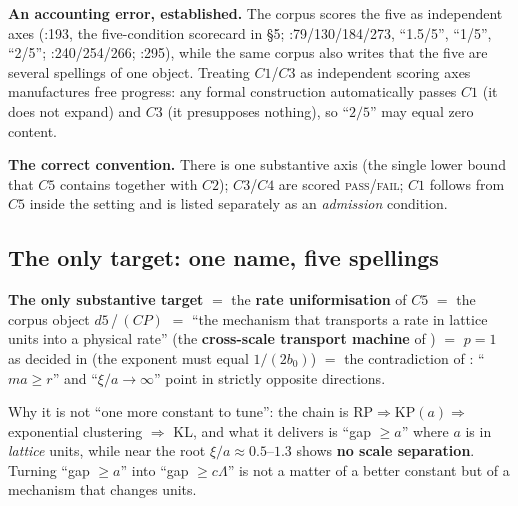 \begin{keybox}
\textbf{An accounting error, established.} The corpus scores the five as independent axes
(:193, the five-condition scorecard in \S5; :79/130/184/273,
``1.5/5'', ``1/5'', ``2/5''; :240/254/266; :295), while the same
corpus also writes that the five are several spellings of one object. Treating $C1$/$C3$ as
independent scoring axes manufactures free progress: any formal construction automatically passes
$C1$ (it does not expand) and $C3$ (it presupposes nothing), so ``$2/5$'' may equal zero content. \LN
\end{keybox}

\noindent
\textbf{The correct convention.} There is one substantive axis (the single lower bound that $C5$
contains together with $C2$); $C3$/$C4$ are scored \textsc{pass}/\textsc{fail}; $C1$ follows from
$C5$ inside the setting and is listed separately as an \emph{admission} condition. \LT
{}

\subsection{The only target: one name, five spellings}

\begin{keybox}
\textbf{The only substantive target} $=$ the \textbf{rate uniformisation} of $C5$
$=$ the corpus object $d5$\,/\,$(CP)$
$=$ ``the mechanism that transports a rate in lattice units into a physical rate'' (the
\textbf{cross-scale transport machine} of )
$=$ $p=1$ as decided in  (the exponent must equal $1/(2b_0)$)
$=$ the contradiction of : ``$ma\ge r$'' and ``$\xi/a\to\infty$'' point in strictly opposite
directions. \LM
\end{keybox}

\noindent
Why it is not ``one more constant to tune'': the chain is $\mathrm{RP}\Rightarrow \mathrm{KP}(a)
\Rightarrow$ exponential clustering $\Rightarrow$ KL, and what it delivers is ``gap $\ge a$'' where $a$
is in \emph{lattice} units, while near the root $\xi/a\approx0.5$--$1.3$ shows \textbf{no scale
separation}. Turning ``gap $\ge a$'' into ``gap $\ge c\Lambda$'' is not a matter of a better constant
but of a mechanism that changes units. \LM
{}

